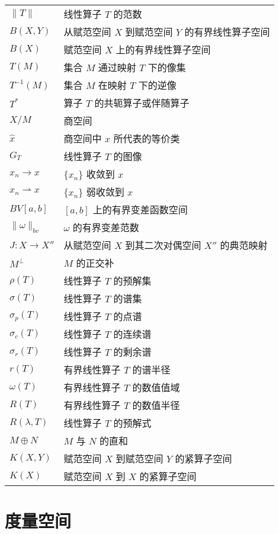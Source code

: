 \documentclass[openany]{ctexbook}
\theoremstyle{kaiti}
\theoremstyle{normal}
\begin{document}
\begin{longtable}[l]{p{4cm}l}
  $\|T\|$  & 线性算子 $T$ 的范数 \\
  $B(X,Y)$  & 从赋范空间 $X$ 到赋范空间 $Y$ 的有界线性算子空间 \\
  $B(X)$  & 赋范空间 $X$ 上的有界线性算子空间 \\
  $T(M)$  & 集合 $M$ 通过映射 $T$ 下的像集 \\
  $T^{-1}(M)$  & 集合 $M$ 在映射 $T$ 下的逆像 \\
  $T^*$  & 算子 $T$ 的共轭算子或伴随算子 \\
  $X/M$  & 商空间 \\
  $\hat{x}$  & 商空间中 $x$ 所代表的等价类 \\
  $G_T$  & 线性算子 $T$ 的图像 \\
  $x_n\to x$  & $\{x_n\}$ 收敛到 $x$ \\
  $x_n\rightharpoonup x$  & $\{x_n\}$ 弱收敛到 $x$  \\
  $BV[a,b]$  & $[a,b]$ 上的有界变差函数空间 \\
  $\|\omega\|_{bv}$  & $\omega$ 的有界变差范数 \\
  $J:X\to X''$  & 从赋范空间 $X$ 到其二次对偶空间 $X''$ 的典范映射 \\
  $M^{\perp}$  & $M$ 的正交补 \\
  $\rho(T)$  & 线性算子 $T$ 的预解集  \\
  $\sigma(T)$  & 线性算子 $T$ 的谱集 \\
  $\sigma_p(T)$  & 线性算子 $T$ 的点谱 \\
  $\sigma_c(T)$  &  线性算子 $T$ 的连续谱 \\
  $\sigma_r(T)$  & 线性算子 $T$ 的剩余谱 \\
  $r(T)$  & 有界线性算子 $T$ 的谱半径 \\
  $\omega(T)$  & 有界线性算子 $T$ 的数值值域  \\
  $R(T)$  &  有界线性算子 $T$ 的数值半径 \\
  $R(\lambda,T)$  & 线性算子 $T$ 的预解式 \\
  $M\oplus N$  & $M$ 与 $N$ 的直和  \\
  $K(X,Y)$  & 赋范空间 $X$ 到赋范空间 $Y$ 的紧算子空间 \\
  $K(X)$  & 赋范空间 $X$ 到 $X$ 的紧算子空间  \\
\end{longtable}

\tableofcontents

\mainmatter

\chapter{度量空间}
\end{document}
